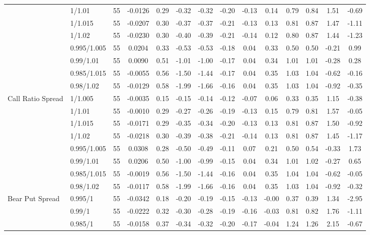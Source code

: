 \begin{tabular}{llcccccccccccc}
 & 1/1.01 & 55 & -0.0126 & 0.29 & -0.32 & -0.32 & -0.20 & -0.13 & 0.14 & 0.79 & 0.84 & 1.51 & -0.69 \\
 & 1/1.015 & 55 & -0.0207 & 0.30 & -0.37 & -0.37 & -0.21 & -0.13 & 0.13 & 0.81 & 0.87 & 1.47 & -1.11 \\
 & 1/1.02 & 55 & -0.0230 & 0.30 & -0.40 & -0.39 & -0.21 & -0.14 & 0.12 & 0.80 & 0.87 & 1.44 & -1.23 \\
 & 0.995/1.005 & 55 & 0.0204 & 0.33 & -0.53 & -0.53 & -0.18 & 0.04 & 0.33 & 0.50 & 0.50 & -0.21 & 0.99 \\
 & 0.99/1.01 & 55 & 0.0090 & 0.51 & -1.01 & -1.00 & -0.17 & 0.04 & 0.34 & 1.01 & 1.01 & -0.28 & 0.28 \\
 & 0.985/1.015 & 55 & -0.0055 & 0.56 & -1.50 & -1.44 & -0.17 & 0.04 & 0.35 & 1.03 & 1.04 & -0.62 & -0.16 \\
 & 0.98/1.02 & 55 & -0.0129 & 0.58 & -1.99 & -1.66 & -0.16 & 0.04 & 0.35 & 1.03 & 1.04 & -0.92 & -0.35 \\
Call Ratio Spread & 1/1.005 & 55 & -0.0035 & 0.15 & -0.15 & -0.14 & -0.12 & -0.07 & 0.06 & 0.33 & 0.35 & 1.15 & -0.38 \\
 & 1/1.01 & 55 & -0.0010 & 0.29 & -0.27 & -0.26 & -0.19 & -0.13 & 0.15 & 0.79 & 0.81 & 1.57 & -0.05 \\
 & 1/1.015 & 55 & -0.0171 & 0.29 & -0.35 & -0.34 & -0.20 & -0.13 & 0.13 & 0.81 & 0.87 & 1.50 & -0.92 \\
 & 1/1.02 & 55 & -0.0218 & 0.30 & -0.39 & -0.38 & -0.21 & -0.14 & 0.13 & 0.81 & 0.87 & 1.45 & -1.17 \\
 & 0.995/1.005 & 55 & 0.0308 & 0.28 & -0.50 & -0.49 & -0.11 & 0.07 & 0.21 & 0.50 & 0.54 & -0.33 & 1.73 \\
 & 0.99/1.01 & 55 & 0.0206 & 0.50 & -1.00 & -0.99 & -0.15 & 0.04 & 0.34 & 1.01 & 1.02 & -0.27 & 0.65 \\
 & 0.985/1.015 & 55 & -0.0019 & 0.56 & -1.50 & -1.44 & -0.16 & 0.04 & 0.35 & 1.04 & 1.04 & -0.62 & -0.05 \\
 & 0.98/1.02 & 55 & -0.0117 & 0.58 & -1.99 & -1.66 & -0.16 & 0.04 & 0.35 & 1.03 & 1.04 & -0.92 & -0.32 \\
Bear Put Spread & 0.995/1 & 55 & -0.0342 & 0.18 & -0.20 & -0.19 & -0.15 & -0.13 & -0.00 & 0.37 & 0.39 & 1.34 & -2.95 \\
 & 0.99/1 & 55 & -0.0222 & 0.32 & -0.30 & -0.28 & -0.19 & -0.16 & -0.03 & 0.81 & 0.82 & 1.76 & -1.11 \\
 & 0.985/1 & 55 & -0.0158 & 0.37 & -0.34 & -0.32 & -0.20 & -0.17 & -0.04 & 1.24 & 1.26 & 2.15 & -0.67 \\

\end{tabular}
